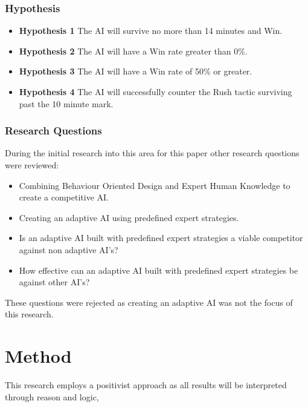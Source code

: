 \documentclass[journal]{IEEEtran}
\begin{document}
\subsubsection{Hypothesis}
\begin{itemize}
	\item \textbf{Hypothesis 1} The AI will survive no more than 14 minutes and Win.
	\item \textbf{Hypothesis 2} The AI will have a Win rate greater than 0\%.
	\item \textbf{Hypothesis 3} The AI will have a Win rate of 50\% or greater.	
	\item \textbf{Hypothesis 4} The AI will successfully counter the Rush tactic surviving past the 10 minute mark.
\end{itemize}

\subsubsection{Research Questions}
During the initial research into this area for this paper other research questions were reviewed:
\begin{itemize}
	\item Combining Behaviour Oriented Design and Expert Human Knowledge to create a competitive AI.
	
	\item Creating an adaptive AI using predefined expert strategies. 
	
	\item Is an adaptive AI built with predefined expert strategies a viable competitor against non adaptive AI’s?
	
	\item How effective can an adaptive AI built with predefined expert strategies be against other AI’s?	
\end{itemize}
These questions were rejected as creating an adaptive AI was not the focus of this research.
\newline

\section{Method}


This research employs a positivist approach as all results will be interpreted through reason and logic, 
\end{document}

